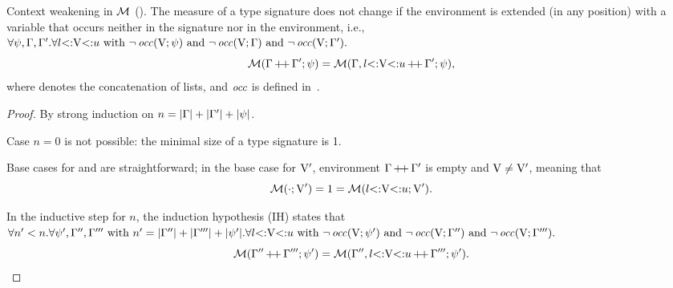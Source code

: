 \begin{lemma}{Context weakening in $\operatorname{\mathcal{M}}$ (\textbf{}).}%
\label{lem:msr-weakening:app}
    The measure of a type signature does not change if the environment
    is extended (in any position) with a variable that occurs neither
    in the signature nor in the environment, i.e.,
    $\forall \psi, \Gamma, \Gamma'. 
    \forall l{\operatorname{<:}}\mathrm{V}{\operatorname{<:}}u \text{ with } 
    \lnot \operatorname{\mathit{occ}}(\mathrm{V};\psi) \text{ and } 
    \lnot \operatorname{\mathit{occ}}(\mathrm{V};\Gamma) \text{ and } \lnot \operatorname{\mathit{occ}}(\mathrm{V};\Gamma').$
    \[\operatorname{\mathcal{M}}(\Gamma\operatorname{+\!+}\Gamma';\psi) = 
        \operatorname{\mathcal{M}}(\Gamma,l{\operatorname{<:}}\mathrm{V}{\operatorname{<:}}u\operatorname{+\!+}\Gamma';\psi),\]
    where  denotes the concatenation of lists,
    and $\operatorname{\mathit{occ}}$ is defined in~.
\end{lemma}
\begin{proof}
    By strong induction on $n = |\Gamma| + |\Gamma'| + |\psi|$.

    Case $n = 0$ is not possible: the minimal size of a type signature is 1.

    Base cases for \tyany and \tybot are straightforward; in the base case
    for $\mathrm{V}'$, environment $\Gamma\operatorname{+\!+}\Gamma'$ is empty and
    $\mathrm{V} \neq \mathrm{V}'$, 
    meaning that \[\operatorname{\mathcal{M}}(\cdot;\mathrm{V}') = 1 = 
    \operatorname{\mathcal{M}}(l{\operatorname{<:}}\mathrm{V}{\operatorname{<:}}u;\mathrm{V}').\]
    
    In the inductive step for $n$, the induction hypothesis (IH) states that
    $\forall n'<n. \forall \psi', \Gamma'', \Gamma'''  \text{ with }
    n' = |\Gamma''| + |\Gamma'''| + |\psi'|.
    \forall l{\operatorname{<:}}\mathrm{V}{\operatorname{<:}}u \text{ with } 
    \lnot \operatorname{\mathit{occ}}(\mathrm{V};\psi') \text{ and } 
    \lnot \operatorname{\mathit{occ}}(\mathrm{V};\Gamma'') \text{ and } \lnot \operatorname{\mathit{occ}}(\mathrm{V};\Gamma''').$
    \[\operatorname{\mathcal{M}}(\Gamma''\operatorname{+\!+}\Gamma''';\psi') = 
    \operatorname{\mathcal{M}}(\Gamma'',l{\operatorname{<:}}\mathrm{V}{\operatorname{<:}}u\operatorname{+\!+}\Gamma''';\psi').\]
    

\end{proof}
